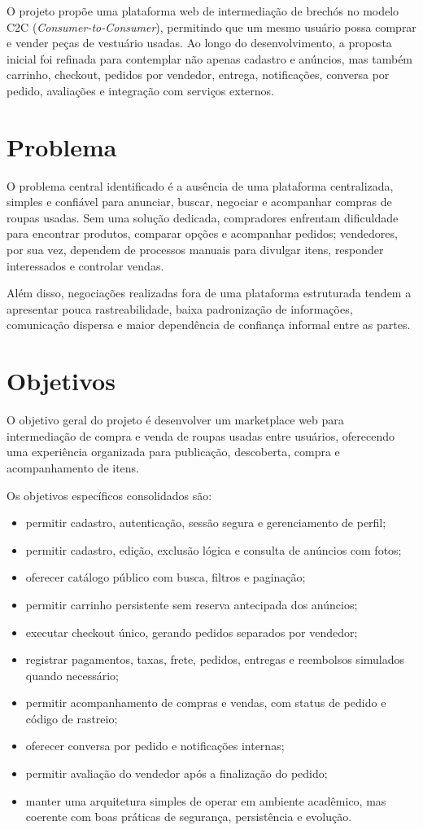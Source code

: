 ﻿\documentclass[12pt,a4paper]{article}
\begin{document}
O projeto propõe uma plataforma web de intermediação de brechós no modelo C2C (\textit{Consumer-to-Consumer}), permitindo que um mesmo usuário possa comprar e vender peças de vestuário usadas. Ao longo do desenvolvimento, a proposta inicial foi refinada para contemplar não apenas cadastro e anúncios, mas também carrinho, checkout, pedidos por vendedor, entrega, notificações, conversa por pedido, avaliações e integração com serviços externos.

\section{Problema}
O problema central identificado é a ausência de uma plataforma centralizada, simples e confiável para anunciar, buscar, negociar e acompanhar compras de roupas usadas. Sem uma solução dedicada, compradores enfrentam dificuldade para encontrar produtos, comparar opções e acompanhar pedidos; vendedores, por sua vez, dependem de processos manuais para divulgar itens, responder interessados e controlar vendas.

Além disso, negociações realizadas fora de uma plataforma estruturada tendem a apresentar pouca rastreabilidade, baixa padronização de informações, comunicação dispersa e maior dependência de confiança informal entre as partes.

\section{Objetivos}
O objetivo geral do projeto é desenvolver um marketplace web para intermediação de compra e venda de roupas usadas entre usuários, oferecendo uma experiência organizada para publicação, descoberta, compra e acompanhamento de itens.

Os objetivos específicos consolidados são:

\begin{itemize}
    \item permitir cadastro, autenticação, sessão segura e gerenciamento de perfil;
    \item permitir cadastro, edição, exclusão lógica e consulta de anúncios com fotos;
    \item oferecer catálogo público com busca, filtros e paginação;
    \item permitir carrinho persistente sem reserva antecipada dos anúncios;
    \item executar checkout único, gerando pedidos separados por vendedor;
    \item registrar pagamentos, taxas, frete, pedidos, entregas e reembolsos simulados quando necessário;
    \item permitir acompanhamento de compras e vendas, com status de pedido e código de rastreio;
    \item oferecer conversa por pedido e notificações internas;
    \item permitir avaliação do vendedor após a finalização do pedido;
    \item manter uma arquitetura simples de operar em ambiente acadêmico, mas coerente com boas práticas de segurança, persistência e evolução.
\end{itemize}
\end{document}
